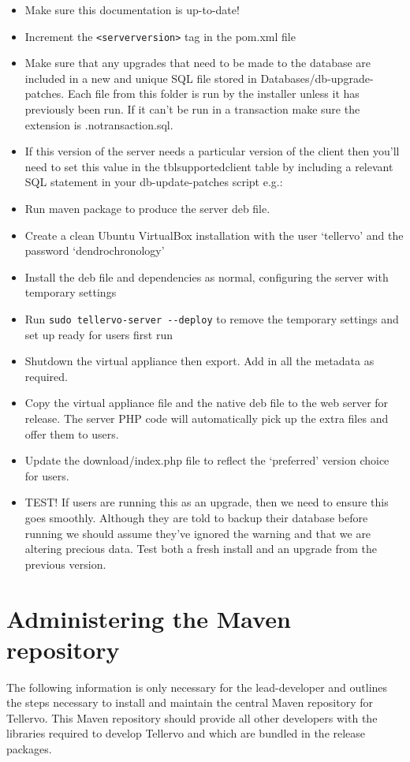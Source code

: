 \begin{itemize}
 \item Make sure this documentation is up-to-date! 
 \item Increment the \verb|<serverversion>| tag in the pom.xml file
 \item Make sure that any upgrades that need to be made to the database are included in a new and unique SQL file stored in Databases/db-upgrade-patches.  Each file from this folder is run by the installer unless it has previously been run. If it can't be run in a transaction make sure the extension is .notransaction.sql. 
 \item If this version of the server needs a particular version of the client then you'll need to set this value in the tblsupportedclient table by including a relevant SQL statement in your db-update-patches script e.g.: 
 \item Run maven package to produce the server deb file.
 \item Create a clean Ubuntu VirtualBox installation with the user `tellervo' and the password `dendrochronology'
 \item Install the deb file and dependencies as normal, configuring the server with temporary settings
 \item Run \verb|sudo tellervo-server --deploy| to remove the temporary settings and set up ready for users first run
 \item Shutdown the virtual appliance then export.  Add in all the metadata as required.
 \item Copy the virtual appliance file and the native deb file to the web server for release.  The server PHP code will automatically pick up the extra files and offer them to users.  
 \item Update the download/index.php file to reflect the `preferred' version choice for users.
 \item TEST!  If users are running this as an upgrade, then we need to ensure this goes smoothly.  Although they are told to backup their database before running we should assume they've ignored the warning and that we are altering precious data. Test both a fresh install and an upgrade from the previous version.
\end{itemize}



\section{Administering the Maven repository}
The following information is only necessary for the lead-developer and outlines the steps necessary to install and maintain the central Maven repository for Tellervo.  This Maven repository should provide all other developers with the libraries required to develop Tellervo and which are bundled in the release packages.

